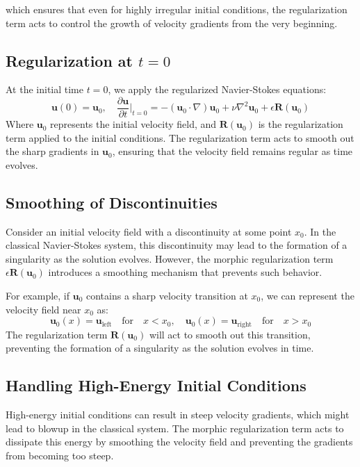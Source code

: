\documentclass{article}
\begin{document}
which ensures that even for highly irregular initial conditions, the regularization term acts to control the growth of velocity gradients from the very beginning.


\subsection*{Regularization at \( t = 0 \)}

At the initial time \( t = 0 \), we apply the regularized Navier-Stokes equations:
\[
\mathbf{u}(0) = \mathbf{u}_0, \quad \frac{\partial \mathbf{u}}{\partial t}\Big|_{t=0} = -(\mathbf{u}_0 \cdot \nabla)\mathbf{u}_0 + \nu \nabla^2 \mathbf{u}_0 + \epsilon \mathbf{R}(\mathbf{u}_0)
\]
Where \( \mathbf{u}_0 \) represents the initial velocity field, and \( \mathbf{R}(\mathbf{u}_0) \) is the regularization term applied to the initial conditions. The regularization term acts to smooth out the sharp gradients in \( \mathbf{u}_0 \), ensuring that the velocity field remains regular as time evolves.

\subsection*{Smoothing of Discontinuities}

Consider an initial velocity field with a discontinuity at some point \( x_0 \). In the classical Navier-Stokes system, this discontinuity may lead to the formation of a singularity as the solution evolves. However, the morphic regularization term \( \epsilon \mathbf{R}(\mathbf{u}_0) \) introduces a smoothing mechanism that prevents such behavior.

For example, if \( \mathbf{u}_0 \) contains a sharp velocity transition at \( x_0 \), we can represent the velocity field near \( x_0 \) as:
\[
\mathbf{u}_0(x) = \mathbf{u}_{\text{left}} \quad \text{for} \quad x < x_0, \quad \mathbf{u}_0(x) = \mathbf{u}_{\text{right}} \quad \text{for} \quad x > x_0
\]
The regularization term \( \mathbf{R}(\mathbf{u}_0) \) will act to smooth out this transition, preventing the formation of a singularity as the solution evolves in time.

\subsection*{Handling High-Energy Initial Conditions}

High-energy initial conditions can result in steep velocity gradients, which might lead to blowup in the classical system. The morphic regularization term acts to dissipate this energy by smoothing the velocity field and preventing the gradients from becoming too steep. 
\end{document}
